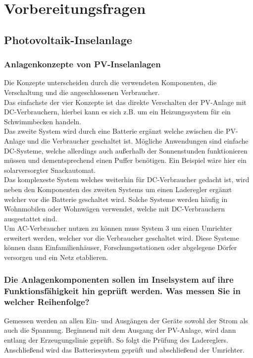 \newpage
\section{Vorbereitungsfragen}
\subsection{Photovoltaik-Inselanlage}
\subsubsection{Anlagenkonzepte von PV-Inselanlagen }
Die Konzepte unterscheiden durch die verwendeten
Komponenten, die Verschaltung und die angeschlossenen Verbraucher.\\
Das einfachste der vier Konzepte ist das direkte Verschalten der PV-Anlage mit
DC-Verbrauchern, hierbei kann es sich z.B. um ein Heizungssystem für ein Schwimmbecken handeln.\\
Das zweite System wird durch eine Batterie ergänzt welche zwischen die PV-Anlage und die Verbraucher geschaltet ist.
Mögliche Anwendungen sind einfache DC-Systeme, welche allerdings auch außerhalb der Sonnenstunden
funktionieren müssen und dementsprechend einen Puffer benötigen. Ein Beispiel wäre hier ein solarversorgter Snackautomat.\\
Das komplexeste System welches weiterhin für DC-Verbraucher gedacht ist, wird neben den Komponenten des zweiten Systems
um einen Laderegler ergänzt welcher vor die Batterie geschaltet wird. Solche Systeme werden häufig in
Wohnmobilen oder Wohnwägen verwendet, welche mit DC-Verbrauchern ausgestattet sind.\\
Um AC-Verbraucher nutzen zu können muss System 3 um einen Umrichter erweitert werden, welcher vor die Verbraucher geschaltet wird. Diese Systeme können dann Einfamilienhäuser, Forschungsstationen oder abgelegene Dörfer versorgen und ein Netz etablieren.\\ 
\subsubsection{Die Anlagenkomponenten sollen im Inselsystem auf ihre Funktionsfähigkeit hin geprüft werden. Was messen Sie in welcher Reihenfolge?}
Gemessen werden an allen Ein- und Ausgängen der Geräte sowohl der Strom als auch die Spannung.
Beginnend mit dem Ausgang der PV-Anlage, wird dann entlang der Erzeugungslinie geprüft.
So folgt die Prüfung des Ladereglers. Anschließend wird das Batteriesystem geprüft und abschließend der 
Umrichter.\\


